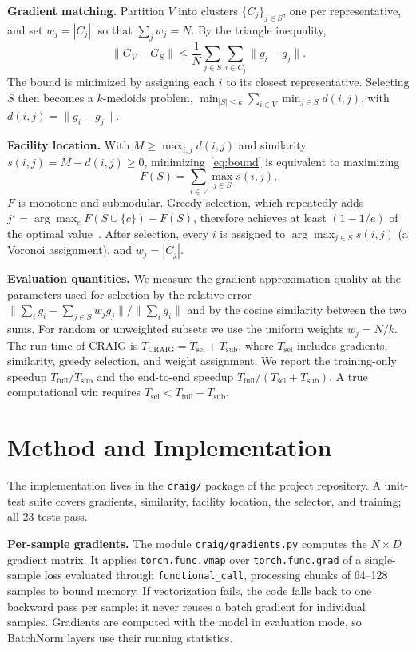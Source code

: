 \documentclass[conference]{IEEEtran}
\newcommand{\Tsel}{T_{\mathrm{sel}}}
\newcommand{\Tsub}{T_{\mathrm{sub}}}
\newcommand{\Tfull}{T_{\mathrm{full}}}
\begin{document}
\textbf{Gradient matching.} Partition $V$ into clusters $\{C_j\}_{j\in S}$, one per representative, and set $w_j=|C_j|$, so that $\sum_j w_j=N$. By the triangle inequality,
\begin{equation}
\|G_V-G_S\| \le \frac{1}{N}\sum_{j\in S}\sum_{i\in C_j}\|g_i-g_j\|.
\label{eq:bound}
\end{equation}
The bound is minimized by assigning each $i$ to its closest representative. Selecting $S$ then becomes a $k$-medoids problem, $\min_{|S|\le k}\sum_{i\in V}\min_{j\in S} d(i,j)$, with $d(i,j)=\|g_i-g_j\|$.

\textbf{Facility location.} With $M\ge\max_{i,j}d(i,j)$ and similarity $s(i,j)=M-d(i,j)\ge 0$, minimizing~\eqref{eq:bound} is equivalent to maximizing
\begin{equation}
F(S)=\sum_{i\in V}\max_{j\in S}s(i,j).
\label{eq:fl}
\end{equation}
$F$ is monotone and submodular. Greedy selection, which repeatedly adds $j^\star=\arg\max_c F(S\cup\{c\})-F(S)$, therefore achieves at least $(1-1/e)$ of the optimal value~\cite{nemhauser1978analysis}. After selection, every $i$ is assigned to $\arg\max_{j\in S}s(i,j)$ (a Voronoi assignment), and $w_j=|C_j|$.

\textbf{Evaluation quantities.} We measure the gradient approximation quality at the parameters used for selection by the relative error $\|\sum_i g_i-\sum_{j\in S}w_jg_j\|/\|\sum_i g_i\|$ and by the cosine similarity between the two sums. For random or unweighted subsets we use the uniform weights $w_j=N/k$. The run time of CRAIG is $T_{\mathrm{CRAIG}}=\Tsel+\Tsub$, where $\Tsel$ includes gradients, similarity, greedy selection, and weight assignment. We report the training-only speedup $\Tfull/\Tsub$ and the end-to-end speedup $\Tfull/(\Tsel+\Tsub)$. A true computational win requires $\Tsel<\Tfull-\Tsub$.

\section{Method and Implementation}
\label{sec:method}
The implementation lives in the \texttt{craig/} package of the project repository. A unit-test suite covers gradients, similarity, facility location, the selector, and training; all 23 tests pass.

\textbf{Per-sample gradients.} The module \texttt{craig/\allowbreak gradients.py} computes the $N\times D$ gradient matrix. It applies \texttt{torch.func.vmap} over \texttt{torch.func.grad} of a single-sample loss evaluated through \texttt{functional\_call}, processing chunks of 64--128 samples to bound memory. If vectorization fails, the code falls back to one backward pass per sample; it never reuses a batch gradient for individual samples. Gradients are computed with the model in evaluation mode, so BatchNorm layers use their running statistics.
\end{document}
